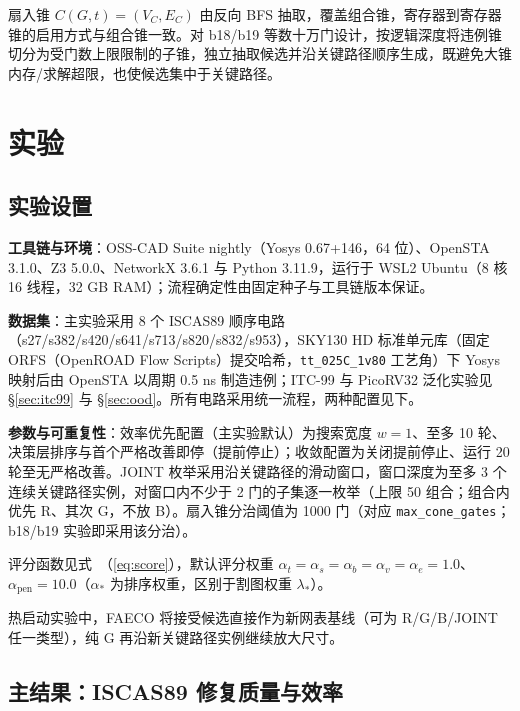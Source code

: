 \documentclass[journal]{IEEEtran}
\renewcommand{\eqref}[1]{\textup{（\ref{#1}）}}
\begin{document}
扇入锥 $C(G, t) = (V_C, E_C)$ 由反向 BFS 抽取，覆盖组合锥，寄存器到寄存器锥的启用方式与组合锥一致。对 b18/b19 等数十万门设计，按逻辑深度将违例锥切分为受门数上限限制的子锥，独立抽取候选并沿关键路径顺序生成，既避免大锥内存/求解超限，也使候选集中于关键路径。

\section{实验}\label{sec:exp}

\subsection{实验设置}\label{sec:setup}

\textbf{工具链与环境}：OSS-CAD Suite nightly（Yosys 0.67+146，64 位）、OpenSTA 3.1.0、Z3 5.0.0、NetworkX 3.6.1 与 Python 3.11.9，运行于 WSL2 Ubuntu（8 核 16 线程，32 GB RAM）；流程确定性由固定种子与工具链版本保证。

\textbf{数据集}：主实验采用 8 个 ISCAS89 顺序电路（s27/s382/s420/s641/s713/s820/s832/s953），SKY130 HD 标准单元库（固定 ORFS（OpenROAD Flow Scripts）提交哈希，\texttt{tt\_025C\_1v80} 工艺角）下 Yosys 映射后由 OpenSTA 以周期 0.5 ns 制造违例；ITC-99 与 PicoRV32 泛化实验见 \S\ref{sec:itc99} 与 \S\ref{sec:ood}。所有电路采用统一流程，两种配置见下。

\textbf{参数与可重复性}：效率优先配置（主实验默认）为搜索宽度 $w=1$、至多 10 轮、决策层排序与首个严格改善即停（提前停止）；收敛配置为关闭提前停止、运行 20 轮至无严格改善。JOINT 枚举采用沿关键路径的滑动窗口，窗口深度为至多 3 个连续关键路径实例，对窗口内不少于 2 门的子集逐一枚举（上限 50 组合；组合内优先 R、其次 G，不放 B）。扇入锥分治阈值为 1000 门（对应 \texttt{max\_cone\_gates}；b18/b19 实验即采用该分治）。

评分函数见式~\eqref{eq:score}，默认评分权重 $\alpha_t=\alpha_s=\alpha_b=\alpha_v=\alpha_e=1.0$、$\alpha_{\mathrm{pen}}=10.0$（$\alpha_*$ 为排序权重，区别于割图权重 $\lambda_*$）。

热启动实验中，FAECO 将接受候选直接作为新网表基线（可为 R/G/B/JOINT 任一类型），纯 G 再沿新关键路径实例继续放大尺寸。

\subsection{主结果：ISCAS89 修复质量与效率}\label{sec:iscas}
\end{document}
